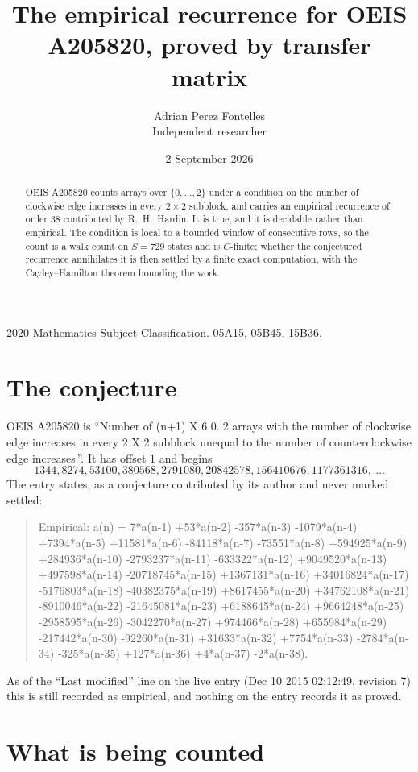 \documentclass[11pt,a4paper]{article}
\title{The empirical recurrence for OEIS A205820, proved by transfer matrix}
\author{Adrian Perez Fontelles\\ \small Independent researcher}
\date{2 September 2026}
\theoremstyle{plain}
\theoremstyle{definition}
\begin{document}
\maketitle

\begin{abstract}
OEIS A205820 counts arrays over $\{0,\dots,2\}$ under a condition on the number of clockwise edge increases
in every $2\times2$ subblock, and carries an empirical recurrence of order $38$ contributed by
R.~H.~Hardin. It is true, and it is decidable rather than empirical. The condition is local to
a bounded window of consecutive rows, so the count is a walk count on $S=729$ states and is
$C$-finite; whether the conjectured recurrence annihilates it is then settled by a finite exact
computation, with the Cayley--Hamilton theorem bounding the work.
\end{abstract}

\noindent\small 2020 Mathematics Subject Classification. 05A15, 05B45, 15B36.\normalsize

\section{The conjecture}

OEIS A205820 is ``Number of (n+1) X 6 0..2 arrays with the number of clockwise edge increases in every 2 X 2 subblock unequal to the number of counterclockwise edge increases.''. It has offset $1$ and begins
\[
1344, 8274, 53100, 380568, 2791080, 20842578, 156410676, 1177361316,\ \dots
\]
The entry states, as a conjecture contributed by its author and never marked settled:
\begin{quote}
Empirical: a(n) = 7*a(n-1) +53*a(n-2) -357*a(n-3) -1079*a(n-4) +7394*a(n-5) +11581*a(n-6) -84118*a(n-7) -73551*a(n-8) +594925*a(n-9) +284936*a(n-10) -2793237*a(n-11) -633322*a(n-12) +9049520*a(n-13) +497598*a(n-14) -20718745*a(n-15) +1367131*a(n-16) +34016824*a(n-17) -5176803*a(n-18) -40382375*a(n-19) +8617455*a(n-20) +34762108*a(n-21) -8910046*a(n-22) -21645081*a(n-23) +6188645*a(n-24) +9664248*a(n-25) -2958595*a(n-26) -3042270*a(n-27) +974466*a(n-28) +655984*a(n-29) -217442*a(n-30) -92260*a(n-31) +31633*a(n-32) +7754*a(n-33) -2784*a(n-34) -325*a(n-35) +127*a(n-36) +4*a(n-37) -2*a(n-38).
\end{quote}
As of the ``Last modified'' line on the live entry (Dec 10 2015 02:12:49, revision 7) this is still
recorded as empirical, and nothing on the entry records it as proved.

\section{What is being counted}
\end{document}
